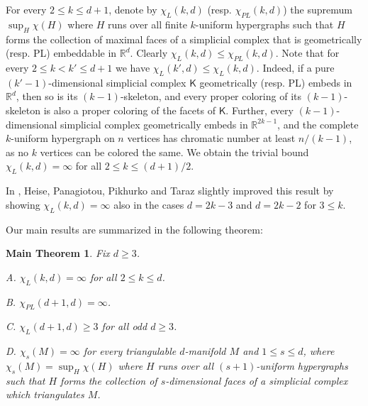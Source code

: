 \documentclass{article}
\newcommand{\RR}{\mathbb{R}}
\newtheorem*{mainthm}{Main Theorem}
\theoremstyle{definition}
\begin{document}
For every $2\le k\le d+1$, denote by $\chi_L(k,d)$ (resp. $\chi_{PL}(k,d)$) the supremum 
$\sup_H \chi(H)$ where $H$ runs over all finite $k$-uniform hypergraphs such that $H$ forms the collection of maximal faces of a simplicial complex that is geometrically (resp. PL) embeddable in $\RR^d$. Clearly $\chi_L(k,d)\le \chi_{PL}(k,d)$. Note that for every $2\le k<k' \le d+1$ we have 
$\chi_L(k',d)\le \chi_L(k,d)$. Indeed, if a pure $(k'-1)$-dimensional simplicial complex $\mathsf{K}$ geometrically (resp. PL) embeds in $\RR^d$, then so is its $(k-1)$-skeleton, and every proper coloring of its $(k-1)$-skeleton is also a proper coloring of the facets of $\mathsf{K}$.
Further, every $(k-1)$-dimensional simplicial complex geometrically embeds in $\RR^{2k-1}$, and the complete $k$-uniform hypergraph on $n$ vertices has chromatic number at least $n/(k-1)$, as no $k$ vertices can be colored the same. We obtain the trivial bound $\chi_L(k,d)=\infty$ for all
$2\le k\le (d+1)/2$.

In \cite{coloring_d-embeddable}, Heise, Panagiotou, Pikhurko and Taraz slightly improved this result by showing $\chi_L(k,d)=\infty$ also in the cases $d=2k-3$ and $d=2k-2$ for $3\le k$. 

\medskip 

Our main results are summarized in the following theorem:
\begin{mainthm}
\label{mainthm}
Fix $d\geq 3$.

A. \label{main1} $\chi_L(k,d)=\infty$ for all $2\le k\le d$. 

B. \label{main2} $\chi_{PL}(d+1,d)=\infty$.

C. $\chi_L(d+1,d)\ge 3$ for all odd $d\ge 3$.

D. $\chi_s(M)=\infty$ for every triangulable 
$d$-manifold $M$ and $1 \leq s\leq d$, where $\chi_s(M)= \sup_{H}\chi(H)$ where $H$ runs over all $(s+1)$-uniform hypergraphs such that $H$ forms the collection of $s$-dimensional faces of a simplicial complex which triangulates $M$.
\end{mainthm}
\end{document}
